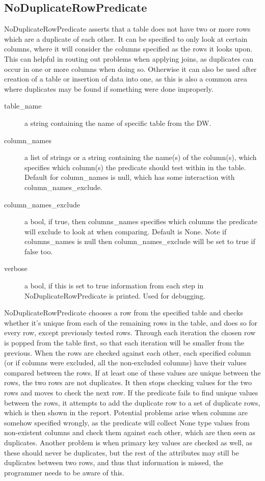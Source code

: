 \subsection{NoDuplicateRowPredicate}

NoDuplicateRowPredicate asserts that a table does not have two or more rows which are a duplicate of each other. It can be specified to only look at certain columns, where it will consider the columns specified as the rows it looks upon. This can helpful in routing out problems when applying joins, as duplicates can occur in one or more columns when doing so. Otherwise it can also be used after creation of a table or insertion of data into one, as this is also a common area where duplicates may be found if something were done improperly.
 

\begin{description}
\item [table\_name] a string containing the name of specific table from the DW. 
\item [column\_names] a list of strings or a string containing the name(s) of the column(s), which specifies which column(s) the predicate should test within in the table. Default for column\_names is null, which has some interaction with column\_names\_exclude.
\item [column\_names\_exclude] a bool, if true, then columns\_names specifies which columns the predicate will exclude to look at when comparing. Default is None. Note if columns\_names is null then column\_names\_exclude will be set to true if false too.
\item [verbose] a bool, if this is set to true information from each step in NoDuplicateRowPredicate is printed. Used for debugging.
\end{description}

NoDuplicateRowPredicate chooses a row from the specified table and checks whether it's unique from each of the remaining rows in the table, and does so for every row, except previously tested rows. Through each iteration the chosen row is popped from the table first, so that each iteration will be smaller from the previous. When the rows are checked against each other, each specified column (or if columns were excluded, all the non-excluded columns) have their values compared between the rows. If at least one of these values are unique between the rows, the two rows are not duplicates. It then stops checking values for the two rows and moves to check the next row. If the predicate fails to find unique values between the rows, it attempts to add the duplicate row to a set of duplicate rows, which is then shown in the report. Potential problems arise when columns are somehow specified wrongly, as the predicate will collect None type values from non-existent columns and check them against each other, which are then seen as duplicates. Another problem is when primary key values are checked as well, as these should never be duplicates, but the rest of the attributes may still be duplicates between two rows, and thus that information is missed, the programmer needs to be aware of this.
